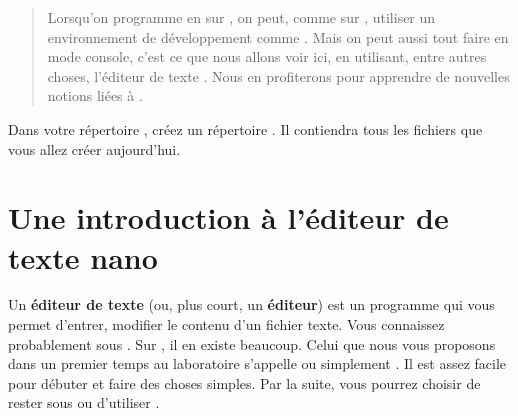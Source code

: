 \documentclass[a4paper,11pt]{style-esi/td}
\begin{document}
\entete
\titre
{}
\lastedit

\bigskip
\begin{abstract}
    Lorsqu'on programme en  sur ,
    on peut, comme sur ,
    utiliser un environnement de développement comme .
    Mais on peut aussi tout faire en mode console, 
    c'est ce que nous allons voir ici, en utilisant, entre autres choses,
    l'éditeur de texte .
    Nous en profiterons pour apprendre de nouvelles notions liées à .
\end{abstract}

\bigskip
\tableofcontents

\vfill
\begin{infobox}
    Dans votre répertoire , 
    créez un répertoire . 
    Il contiendra tous les fichiers que vous allez créer aujourd'hui. 
\end{infobox}
\vfill

\newpage

\section{Une introduction à l'éditeur de texte nano}

	Un \textbf{éditeur de texte} (ou, plus court, un \textbf{éditeur}) 
	est un programme qui vous permet d'entrer, modifier
	le contenu d'un fichier texte. 
	Vous connaissez probablement  sous . 
	Sur , il en existe beaucoup. 
	Celui que nous vous proposons dans un premier temps au laboratoire 
	s'appelle  ou simplement . 
	Il est assez facile pour débuter et faire des choses simples. 
	Par la suite, vous pourrez choisir de rester sous  
	ou d'utiliser .
\end{document}
